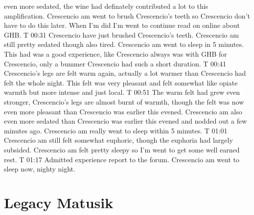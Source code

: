 \documentclass[12pt]{book}
\begin{document}
even more sedated, the wine had definately contributed a lot to this amplification. Crescencio am went to brush Crescencio's teeth so Crescencio don't have to do this later. When I'm did I'm went to continue read on online about GHB. T 00:31 Crescencio have just brushed Crescencio's teeth. Crescencio am still pretty sedated though also tired. Crescencio am went to sleep in 5 minutes. This had was a good experience, like Crescencio always was with GHB for Crescencio, only a bummer Crescencio had such a short duration. T 00:41 Crescencio's legs are felt warm again, actually a lot warmer than Crescencio had felt the whole night. This felt was very pleasant and felt somewhat like opiate warmth but more intense and just local. T 00:51 The warm felt had grew even stronger, Crescencio's legs are almost burnt of warmth, though the felt was now even more pleasant than Crescencio was earlier this evened. Crescencio am also even more sedated than Crescencio was earlier this evened and nodded out a few minutes ago. Crescencio am really went to sleep within 5 minutes. T 01:01 Crescencio am still felt somewhat euphoric, though the euphoria had largely subsided. Crescencio am felt pretty sleepy so I'm went to get some well earned rest. T 01:17 Admitted experience report to the forum. Crescencio am went to sleep now, nighty night.



\chapter{Legacy Matusik}
\end{document}
